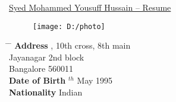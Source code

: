 \documentclass[10pt]{article}
\begin{document}
	
\begin{tabbing}
	\hspace{1cm}
	\underline{\LARGE{Syed Mohammed Yousuff Hussain -- Resume}} %
\end{tabbing}

	\begin{figure}[h]
		\texttt{[image: D:/photo]}
	\end{figure}
	
\parbox{1.5\textwidth}{ %
	\begin{tabbing} %
		\hspace{3cm} \= \hspace{4cm} \= \kill %
		{\bf Address} , 10th cross, 8th main\\ %
		\> Jayanagar 2nd block\\ %
		\> Bangalore 560011\\ %
		{\bf Date of Birth} $^{th}$ May 1995  \\ %
		{\bf Nationality} \> Indian %
	\end{tabbing}}
	\hfill %
	
\end{document}
